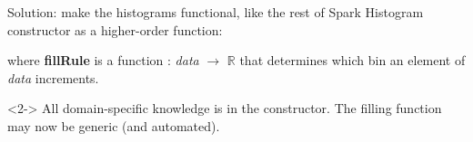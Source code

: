 \documentclass[aspectratio=169]{beamer}
\begin{document}
\begin{frame}[fragile]{Solution: make the histograms functional, like the rest of Spark}
\vspace{0.5 cm}
Histogram constructor as a higher-order function:

\begin{center}
\end{center}

where {\ttfamily\small\textbf{fillRule}} is a function : {\it data} $\to$ $\mathbb{R}$ that determines which bin an element of {\it data} increments.

\begin{uncoverenv}<2->
\vspace{0.5 cm}
All domain-specific knowledge is in the constructor. The filling function may now be generic (and automated).

\begin{center}
\end{center}
\end{uncoverenv}
\end{frame}
\end{document}
